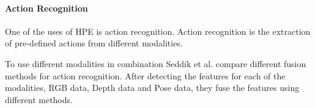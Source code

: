 \paragraph{Action Recognition}

One of the uses of HPE is action recognition. Action recognition is the extraction of pre-defined actions from different modalities. 

To use different modalities in combination Seddik et al. compare different fusion methods for action recognition\cite{Seddik2017}. After detecting the features for each of the modalities, RGB data, Depth data and Pose data, they fuse the features using different methods. 